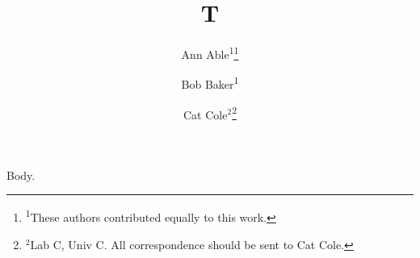 \documentclass[11pt]{article}
\begin{document}
\title{T}
\author{Ann Able\textsuperscript{1}\thanks{\textsuperscript{1}These authors contributed equally to this work.} \and Bob Baker\textsuperscript{1} \and Cat Cole$^{2}$\thanks{$^{2}$Lab C, Univ C. All correspondence should be sent to Cat Cole.}}
\maketitle
Body.
\end{document}
